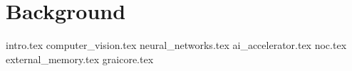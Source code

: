 \chapter{Background}
\label{ch:2}
{intro.tex}
{computer_vision.tex}
{neural_networks.tex}
{ai_accelerator.tex}
{noc.tex}
{external_memory.tex}
{graicore.tex}

